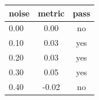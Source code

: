 \begin{center}
\begin{tabular}{@{}lcc@{}}
\toprule
noise & metric & pass \\
\midrule
0.00 & 0.00 & no \\
0.10 & 0.03 & yes \\
0.20 & 0.03 & yes \\
0.30 & 0.05 & yes \\
0.40 & -0.02 & no \\
\bottomrule
\end{tabular}
\end{center}